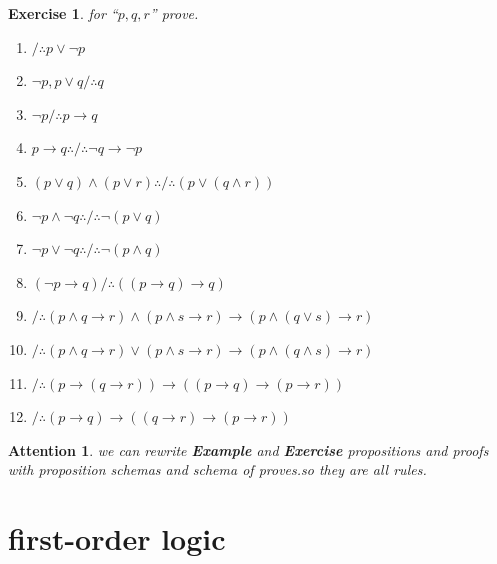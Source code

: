 \documentclass[10pt,a4paper]{book}
\newtheorem{exercise}{Exercise}[section]
\newtheorem{Attention}{Attention}[section]
\begin{document}
\begin{exercise}
    \textbf{} for  ``$p,q,r$'' prove.
    \begin{enumerate}
        \setlength{\itemsep}{0pt} %
        \item  $/\therefore p \vee \neg p$  \quad{}
        \item  $\neg p, p \vee q /\therefore q$ \quad{}
        \item  $\neg p /\therefore p \rightarrow q$ \quad{}
        \item  $p \rightarrow q \therefore /\therefore \neg q \rightarrow \neg p$ \quad{}
        \item  $(p \vee q) \wedge(p \vee r) \therefore /\therefore(p \vee(q \wedge r)) $ \quad{}
        \item  $\neg p \wedge \neg q \therefore /\therefore \neg(p \vee q)$   \quad{}
        \item $\neg p \vee \neg q \therefore /\therefore \neg(p \wedge q)$    \quad{}
        \item  $(\neg p \rightarrow q) /\therefore((p \rightarrow q) \rightarrow q)$
        \item  $/\therefore(p \wedge q \rightarrow r) \wedge(p \wedge s \rightarrow r) \rightarrow(p \wedge(q \vee s) \rightarrow r)$
        \item $/\therefore(p \wedge q \rightarrow r) \vee(p \wedge s \rightarrow r) \rightarrow(p \wedge(q \wedge s) \rightarrow r)$
        \item $/\therefore(p \rightarrow(q \rightarrow r)) \rightarrow((p \rightarrow q) \rightarrow(p \rightarrow r))$
        \item $/\therefore(p \rightarrow q) \rightarrow((q \rightarrow r) \rightarrow(p \rightarrow r))$
    \end{enumerate}
\end{exercise}

\begin{Attention}
    we can rewrite \textbf{Example} and \textbf{Exercise} propositions and
    proofs with proposition schemas and schema of proves.so they are all rules.
\end{Attention}

\chapter{first-order logic}
\end{document}
